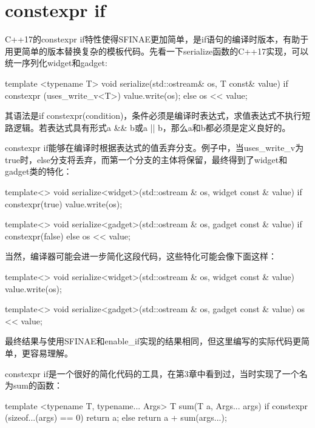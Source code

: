 \section{constexpr if}
C++17的constexpr if特性使得SFINAE更加简单，是if语句的编译时版本，有助于用更简单的版本替换复杂的模板代码。先看一下serialize函数的C++17实现，可以统一序列化widget和gadget:

\begin{cppcode}
template <typename T>
void serialize(std::ostream& os, T const& value)
{
	if constexpr (uses_write_v<T>)
		value.write(os);
	else
		os << value;
}
\end{cppcode}

其语法是if constexpr(condition)，条件必须是编译时表达式，求值表达式不执行短路逻辑。若表达式具有形式a \&\& b或a || b，那么a和b都必须是定义良好的。

constexpr if能够在编译时根据表达式的值丢弃分支。例子中，当uses_write_v为true时，else分支将丢弃，而第一个分支的主体将保留，最终得到了widget和gadget类的特化：

\begin{cppcode}
template<>
void serialize<widget>(std::ostream & os,
                      widget const & value)
{
	if constexpr(true)
	{
		value.write(os);
	}
}

template<>
void serialize<gadget>(std::ostream & os,
                      gadget const & value)
{
	if constexpr(false)
	{
	}
	else
	{
		os << value;
	}
}
\end{cppcode}

当然，编译器可能会进一步简化这段代码，这些特化可能会像下面这样：

\begin{cppcode}
template<>
void serialize<widget>(std::ostream & os,
                       widget const & value)
{
	value.write(os);
}

template<>
void serialize<gadget>(std::ostream & os,
					   gadget const & value)
{
	os << value;
}
\end{cppcode}

最终结果与使用SFINAE和enable_if实现的结果相同，但这里编写的实际代码更简单，更容易理解。

constexpr if是一个很好的简化代码的工具，在第3章中看到过，当时实现了一个名为sum的函数：

\begin{cppcode}
template <typename T, typename... Args>
T sum(T a, Args... args)
{
	if constexpr (sizeof...(args) == 0)
		return a;
	else
		return a + sum(args...);
}
\end{cppcode}

